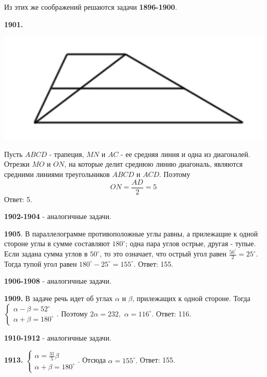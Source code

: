 Из этих же соображений решаются задачи \textbf{1896-1900}.

\textbf{1901.}

{\centering \includegraphics[width=0.5\linewidth]{Geometry/Content/25.png}
	
}

Пусть $ABCD$ - трапеция, $MN$ и $AC$ - ее средняя линия и одна из диагоналей. Отрезки $MO$ и $ON$, на которые делит среднюю линию диагональ, являются средними линиями треугольников $ABCD$ и $ACD$. Поэтому
\[
ON = \frac{AD}{2} = 5
\] \null \hspace*{\fill} Ответ: 5.

\textbf{1902-1904} - аналогичные задачи.

\textbf{1905}. В параллелограмме противоположные углы равны, а прилежащие к одной стороне углы в сумме составляют $180^\circ$; одна пара углов острые, другая - тупые. Если задана сумма углов в $50^\circ$, то это означает, что острый угол равен $\frac{50^\circ}{2} = 25^\circ$. Тогда тупой угол равен $180^\circ - 25^\circ = 155^\circ.$ \newline \null \hspace*{\fill} Ответ: 155.

\textbf{1906-1908} - аналогичные задачи.

\clearpage

\textbf{1909.} В задаче речь идет об углах $\alpha$ и $\beta$, прилежащих к одной стороне. Тогда   $\begin{cases} \alpha - \beta = 52^\circ \\ \alpha + \beta = 180^\circ \end{cases}$. Поэтому $2\alpha = 232,$ $\alpha = 116^\circ.$ \newline \null \hspace*{\fill} Ответ: 116.

\textbf{1910-1912} - аналогичные задачи.

\textbf{1913.} $\begin{cases} \alpha = \frac{31}{5}\beta \\ \alpha + \beta = 180^\circ \end{cases}$. Отсюда $\alpha = 155^\circ.$ \newline \null \hspace*{\fill} Ответ: 155.

